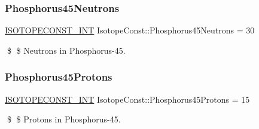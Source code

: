 \subsubsection{\texorpdfstring{Phosphorus45\+Neutrons}{Phosphorus45Neutrons}}
{\footnotesize\ttfamily \mbox{\hyperlink{group___isotope_const-_macros_ga5f18360b3e99483a35c32d789e62621c}{I\+S\+O\+T\+O\+P\+E\+C\+O\+N\+S\+T\+\_\+\+I\+NT}} Isotope\+Const\+::\+Phosphorus45\+Neutrons = 30}

\$ \$ Neutrons in Phosphorus-\/45. \mbox{\label{group___isotope_const-_phosphorus-_p45_gaa96df5730ba3596841d91fc098b5cb03}} 
\subsubsection{\texorpdfstring{Phosphorus45\+Protons}{Phosphorus45Protons}}
{\footnotesize\ttfamily \mbox{\hyperlink{group___isotope_const-_macros_ga5f18360b3e99483a35c32d789e62621c}{I\+S\+O\+T\+O\+P\+E\+C\+O\+N\+S\+T\+\_\+\+I\+NT}} Isotope\+Const\+::\+Phosphorus45\+Protons = 15}

\$ \$ Protons in Phosphorus-\/45. 